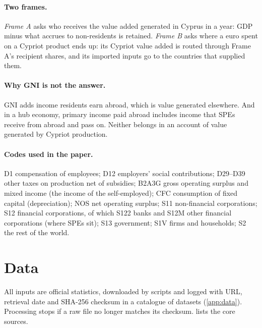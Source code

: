 \documentclass[11pt]{article}
\begin{document}
\paragraph{Two frames.}
\emph{Frame A} asks who receives the value added generated in Cyprus in a year: GDP minus what accrues to non-residents is retained.
\emph{Frame B} asks where a euro spent on a Cypriot product ends up: its Cypriot value added is routed through Frame A's recipient shares, and its imported inputs go to the countries that supplied them.

\paragraph{Why GNI is not the answer.}
GNI adds income residents earn abroad, which is value generated elsewhere.
And in a hub economy, primary income paid abroad includes income that SPEs receive from abroad and pass on.
Neither belongs in an account of value generated by Cypriot production.

\paragraph{Codes used in the paper.}
D1 compensation of employees; D12 employers' social contributions; D29--D39 other taxes on production net of subsidies; B2A3G gross operating surplus and mixed income (the income of the self-employed); CFC consumption of fixed capital (depreciation); NOS net operating surplus; S11 non-financial corporations; S12 financial corporations, of which S122 banks and S12M other financial corporations (where SPEs sit); S13 government; S1V firms and households; S2 the rest of the world.



\section{Data}
\label{sec:data}

All inputs are official statistics, downloaded by scripts and logged with URL, retrieval date and SHA-256 checksum in a catalogue of \CatalogueN{} datasets (\cref{app:data}).
Processing stops if a raw file no longer matches its checksum.
 lists the core sources.
\end{document}
